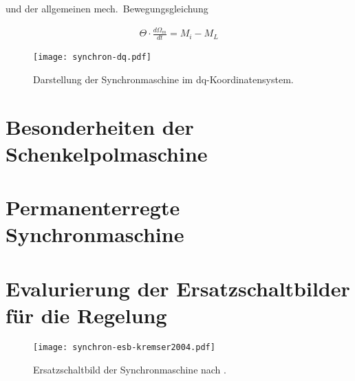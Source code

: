 und der allgemeinen mech.\ Bewegungsgleichung

\begin{align}
\Theta\cdot \frac{d\Omega_m}{dt} = M_i - M_L
\end{align}

\begin{figure}[!htb]
\centering
\texttt{[image: synchron-dq.pdf]}
\label{fig:synchron-dq}
\caption{Darstellung der Synchronmaschine im dq-Koordinatensystem.}
\end{figure}

\section{Besonderheiten der Schenkelpolmaschine}\label{sec:schenkelpol}

\section{Permanenterregte Synchronmaschine}\label{sec:pmsm}

\section{Evalurierung der Ersatzschaltbilder für die Regelung}\label{sec:esb}

\begin{figure}[!htb]
\centering
\texttt{[image: synchron-esb-kremser2004.pdf]}
\label{fig:esb-kremser}
\caption{Ersatzschaltbild der Synchronmaschine nach \parencite[S.~145]{kremser2004}.}
\end{figure}


